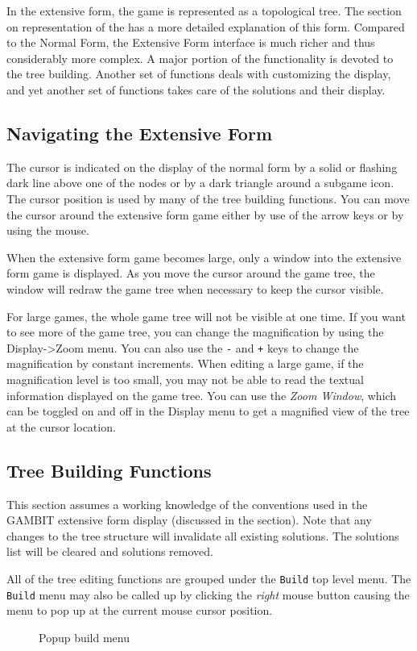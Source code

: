 In the extensive form, the game is represented as a topological tree.  The 
section on representation of the  
has a more detailed explanation of this form.
Compared to the Normal Form, the Extensive Form interface is much richer
and thus considerably more complex.  A major portion of the functionality
is devoted to the tree building.  Another set of functions deals with
customizing the display, and yet another set of functions takes care of
the solutions and their display.  

\subsection{Navigating the Extensive Form}
The cursor is indicated on the display of the normal form by a 
solid or flashing dark line above 
one of the nodes or by a dark triangle around a subgame icon. 
The cursor position is used by many of the tree building functions.  
You can move the cursor around the extensive form game 
either by use of the arrow keys or by using the mouse.  

When the extensive form 
game becomes large, only a window into the extensive form game is displayed.  
As you move the cursor around the game tree, the window will redraw 
the game tree when necessary to keep the cursor visible. 

For large games, the whole game tree will not be visible at one time.  If you 
want to see more of the game tree, you can change the magnification by 
using the Display->Zoom menu.  You can also use the \verb+-+ and 
\verb&+& keys to change the magnification by constant increments. When 
editing a large game, if the magnification level is too small, you may 
not be able to read the textual information displayed on the game tree.  You 
can use the {\em Zoom Window}, which can be toggled on and off in the Display 
menu to get a magnified view of the tree at the cursor location.  

\subsection{Tree Building Functions}
This section assumes a working knowledge of the conventions used in the
GAMBIT extensive form display (discussed in the 
 section). Note that any changes to
the tree structure will invalidate all existing solutions.  The solutions
list will be cleared and solutions removed.

All of the tree editing functions are grouped under the {\tt Build} top
level menu.  The {\tt Build} menu may also be called up by clicking the
{\em right} mouse button causing the menu to pop up at
the current mouse cursor position.
\begin{figure}
\caption{Popup build menu}
\end{figure}

